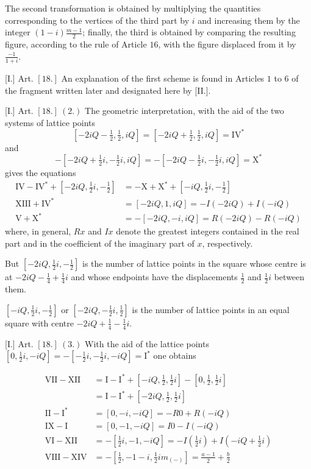 The second transformation is obtained by multiplying the quantities corresponding to the vertices of the third part by $i$ and increasing them by the integer $(1-i)\frac{m-1}{2}$; finally, the third is obtained by comparing the resulting figure, according to the rule of Article $16$, with the figure displaced from it by $\frac{-1}{1+i}$.

[I.] Art. $[18.]$ An explanation of the first scheme is found in Articles $1$ to $6$ of the fragment written later and designated here by [II.].

[I.] Art. $[18.]\ (2.)$ The geometric interpretation, with the aid of the two systems of lattice points
\[
[-2iQ-\tfrac12,\tfrac12,iQ]=[-2iQ+\tfrac12,\tfrac12,iQ]=\mathrm{IV}^{*}
\]
and
\[
-[-2iQ+\tfrac12i,-\tfrac12i,iQ]=-[-2iQ-\tfrac12i,-\tfrac12i,iQ]=\mathrm{X}^{*}
\]
gives the equations
\[
\begin{aligned}
\mathrm{IV}-\mathrm{IV}^{*}+[-2iQ,\tfrac12i,-\tfrac12]
&=-\mathrm{X}+\mathrm{X}^{*}+[-iQ,\tfrac12i,-\tfrac12]\\
\mathrm{XIII}+\mathrm{IV}^{*}&=[-2iQ,1,iQ]=-I(-2iQ)+I(-iQ)\\
\mathrm{V}+\mathrm{X}^{*}&=-[-2iQ,-i,iQ]=R(-2iQ)-R(-iQ)
\end{aligned}
\]
where, in general, $Rx$ and $Ix$ denote the greatest integers contained in the real part and in the coefficient of the imaginary part of $x$, respectively.

But $[-2iQ,\tfrac12i,-\tfrac12]$ is the number of lattice points in the square whose centre is at $-2iQ-\tfrac14+\tfrac14i$ and whose endpoints have the displacements $\tfrac12$ and $\tfrac12i$ between them.

$[-iQ,\tfrac12i,-\tfrac12]$ or $[-2iQ,-\tfrac12i,\tfrac12]$ is the number of lattice points in an equal square with centre $-2iQ+\tfrac14-\tfrac14i$.

[I.] Art. $[18.]\ (3.)$ With the aid of the lattice points $[0,\tfrac12i,-iQ]=-[-\tfrac12i,-\tfrac12i,-iQ]=\mathrm{I}^{*}$ one obtains


\[
\begin{aligned}
\mathrm{VII}-\mathrm{XII}&=\mathrm{I}-\mathrm{I}^{*}+[-iQ,\tfrac12,\tfrac12i]-[0,\tfrac12,\tfrac12i]\\
&=\mathrm{I}-\mathrm{I}^{*}+[-2iQ,\tfrac12,\tfrac12i]\\
\mathrm{II}-\mathrm{I}^{*}&=[0,-i,-iQ]=-R0+R(-iQ)\\
\mathrm{IX}-\mathrm{I}&=[0,-1,-iQ]=I0-I(-iQ)\\
\mathrm{VI}-\mathrm{XII}&=-[\tfrac12i,-1,-iQ]=-I(\tfrac12i)+I(-iQ+\tfrac12i)\\
\mathrm{VIII}-\mathrm{XIV}&=-[\tfrac12,-1-i,\tfrac12im_{(-)}]=\frac{a-1}{2}+\frac b2
\end{aligned}
\]

